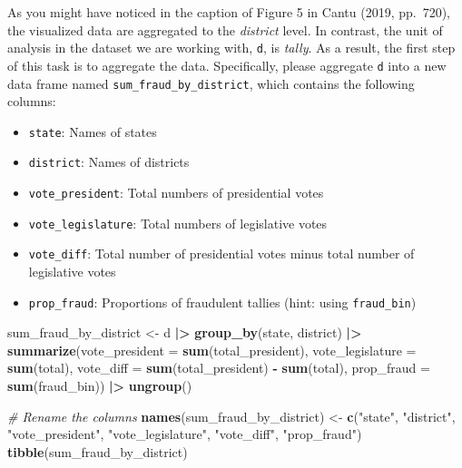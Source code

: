 \documentclass[
]{article}
\newenvironment{Shaded}{\begin{snugshade}}{\end{snugshade}}
\newcommand{\AttributeTok}[1]{\textcolor[rgb]{0.13,0.29,0.53}{#1}}
\newcommand{\CommentTok}[1]{\textcolor[rgb]{0.56,0.35,0.01}{\textit{#1}}}
\newcommand{\FunctionTok}[1]{\textcolor[rgb]{0.13,0.29,0.53}{\textbf{#1}}}
\newcommand{\NormalTok}[1]{#1}
\newcommand{\OtherTok}[1]{\textcolor[rgb]{0.56,0.35,0.01}{#1}}
\newcommand{\SpecialCharTok}[1]{\textcolor[rgb]{0.81,0.36,0.00}{\textbf{#1}}}
\newcommand{\StringTok}[1]{\textcolor[rgb]{0.31,0.60,0.02}{#1}}
\begin{document}
As you might have noticed in the caption of Figure 5 in Cantu (2019,
pp.~720), the visualized data are aggregated to the \emph{district}
level. In contrast, the unit of analysis in the dataset we are working
with, \texttt{d}, is \emph{tally}. As a result, the first step of this
task is to aggregate the data. Specifically, please aggregate \texttt{d}
into a new data frame named \texttt{sum\_fraud\_by\_district}, which
contains the following columns:

\begin{itemize}
\item
  \texttt{state}: Names of states
\item
  \texttt{district}: Names of districts
\item
  \texttt{vote\_president}: Total numbers of presidential votes
\item
  \texttt{vote\_legislature}: Total numbers of legislative votes
\item
  \texttt{vote\_diff}: Total number of presidential votes minus total
  number of legislative votes
\item
  \texttt{prop\_fraud}: Proportions of fraudulent tallies (hint: using
  \texttt{fraud\_bin})
\end{itemize}

\begin{Shaded}
\begin{Highlighting}[]
\NormalTok{sum\_fraud\_by\_district }\OtherTok{\textless{}{-}}\NormalTok{ d }\SpecialCharTok{|\textgreater{}}
  \FunctionTok{group\_by}\NormalTok{(state, district) }\SpecialCharTok{|\textgreater{}}
  \FunctionTok{summarize}\NormalTok{(}\AttributeTok{vote\_president =} \FunctionTok{sum}\NormalTok{(total\_president),}
            \AttributeTok{vote\_legislature =} \FunctionTok{sum}\NormalTok{(total),}
            \AttributeTok{vote\_diff =} \FunctionTok{sum}\NormalTok{(total\_president) }\SpecialCharTok{{-}} \FunctionTok{sum}\NormalTok{(total),}
            \AttributeTok{prop\_fraud =} \FunctionTok{sum}\NormalTok{(fraud\_bin)) }\SpecialCharTok{|\textgreater{}}
\FunctionTok{ungroup}\NormalTok{()}

\CommentTok{\# Rename the columns}
\FunctionTok{names}\NormalTok{(sum\_fraud\_by\_district) }\OtherTok{\textless{}{-}} \FunctionTok{c}\NormalTok{(}\StringTok{"state"}\NormalTok{, }\StringTok{"district"}\NormalTok{, }\StringTok{"vote\_president"}\NormalTok{, }\StringTok{"vote\_legislature"}\NormalTok{, }\StringTok{"vote\_diff"}\NormalTok{, }\StringTok{"prop\_fraud"}\NormalTok{)}
\FunctionTok{tibble}\NormalTok{(sum\_fraud\_by\_district)}
\end{Highlighting}
\end{Shaded}
\end{document}
